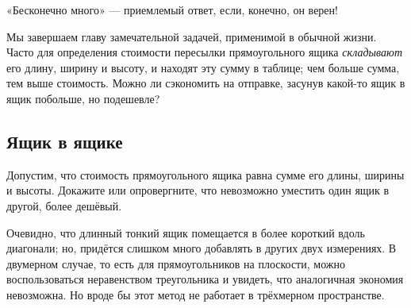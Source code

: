  «Бесконечно много» --- приемлемый ответ, если, конечно, он верен!

\medskip

Мы завершаем главу замечательной задачей, применимой в обычной жизни.
Часто для определения стоимости пересылки прямоугольного ящика \emph{складывают} его длину, ширину и высоту,
и находят эту сумму в таблице;
чем больше сумма, тем выше стоимость.
Можно ли сэкономить на отправке, засунув какой-то ящик в ящик побольше, но подешевле?

\subsection*{Ящик в ящике}\label{Ящик в ящике}

Допустим, что стоимость прямоугольного ящика равна сумме его длины, ширины и высоты.
Докажите или опровергните, что невозможно уместить один ящик в другой, более дешёвый.

Очевидно, что длинный тонкий ящик помещается в более короткий вдоль диагонали;
но, придётся слишком много добавлять в других двух измерениях.
В двумерном случае, то есть для прямоугольников на плоскости, можно воспользоваться неравенством треугольника и увидеть, что аналогичная экономия невозможна.
Но вроде бы этот метод не работает в трёхмерном пространстве.
